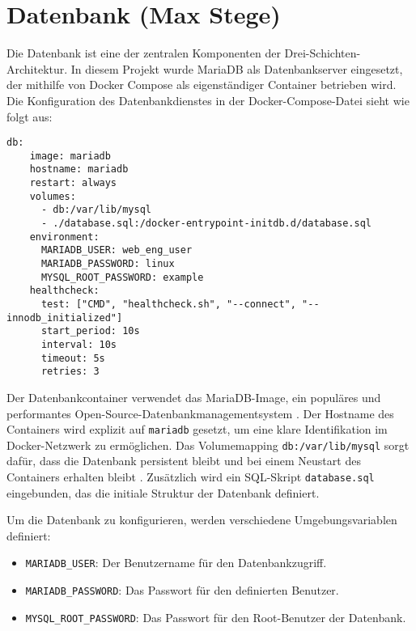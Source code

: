 \chapter{Datenbank (Max Stege)}

Die Datenbank ist eine der zentralen Komponenten der Drei-Schichten-Architektur. In diesem Projekt wurde MariaDB als Datenbankserver eingesetzt, der mithilfe von Docker Compose als eigenständiger Container betrieben wird. Die Konfiguration des Datenbankdienstes in der Docker-Compose-Datei sieht wie folgt aus:

\lstset{
breaklines=true,         %
breakatwhitespace=false, %
basicstyle=\ttfamily,    %
}

\begin{lstlisting}[caption={\texttt{docker-compose.yml}},captionpos=b]
db:
    image: mariadb
    hostname: mariadb
    restart: always
    volumes:
      - db:/var/lib/mysql
      - ./database.sql:/docker-entrypoint-initdb.d/database.sql
    environment:
      MARIADB_USER: web_eng_user
      MARIADB_PASSWORD: linux
      MYSQL_ROOT_PASSWORD: example
    healthcheck:
      test: ["CMD", "healthcheck.sh", "--connect", "--innodb_initialized"]
      start_period: 10s
      interval: 10s
      timeout: 5s
      retries: 3
\end{lstlisting}

Der Datenbankcontainer verwendet das MariaDB-Image, ein populäres und performantes Open-Source-Datenbankmanagementsystem \cite{mariadb_docs}. Der Hostname des Containers wird explizit auf \texttt{mariadb} gesetzt, um eine klare Identifikation im Docker-Netzwerk zu ermöglichen. Das Volumemapping \texttt{db:/var/lib/mysql} sorgt dafür, dass die Datenbank persistent bleibt und bei einem Neustart des Containers erhalten bleibt \cite{docker_persistence}. Zusätzlich wird ein SQL-Skript \texttt{database.sql} eingebunden, das die initiale Struktur der Datenbank definiert.

Um die Datenbank zu konfigurieren, werden verschiedene Umgebungsvariablen definiert:
\begin{itemize}
\item \texttt{MARIADB\_USER}: Der Benutzername für den Datenbankzugriff.
\item \texttt{MARIADB\_PASSWORD}: Das Passwort für den definierten Benutzer.
\item \texttt{MYSQL\_ROOT\_PASSWORD}: Das Passwort für den Root-Benutzer der Datenbank.
\end{itemize}

